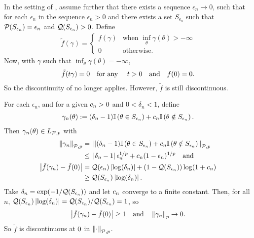 \begin{ex}
%
In the setting of , assume further that there
exists a sequence $\epsilon_n \rightarrow 0$, such that for each $\epsilon_n$ in
the sequence $\epsilon_n > 0$ and there exists a set $S_{\epsilon_n}$ such that
$\mathcal{P}(S_{\epsilon_n}) = \epsilon_n$ and $\mathcal{Q}(S_{\epsilon_n}) > 0$. Define
%
\begin{align*}
%
\tilde{f}(\gamma) = \begin{cases}
    f(\gamma) & \textrm{when }\inf_\theta \gamma(\theta) > -\infty \\
    0 & \textrm{otherwise}.
\end{cases}
%
\end{align*}
%
Now, with $\gamma$ such that $\inf_\theta \gamma(\theta) = -\infty$,
%
\begin{align*}
%
\tilde{f}(\t \gamma) = 0 \mathtxt{for any }\t > 0 \mathtxt{and} f(\phiz) = 0.
%
\end{align*}
%
So the discontinuity of  no longer applies.
However, $\tilde{f}$ is still discontinuous.

For each $\epsilon_n$, and for a given $c_n > 0$ and $0 < \delta_n < 1$, define
%
\begin{align*}
%
\gamma_n(\theta) :=
(\delta_n - 1)\ind{\theta \in S_{\epsilon_n}} +
\c_n \ind{\theta \notin S_{\epsilon_n}}.
%
\end{align*}
%
Then $\gamma_n(\theta) \in {L_{\mathcal{P},p}}$ with
%
\begin{align*}
%
\norm{\gamma_n}_{\p,p} ={}&
\norm{(\delta_n - 1) \ind{\theta \in S_{\epsilon_n}} +
      \c_n \ind{\theta \notin S_{\epsilon_n}}}_{\p,p}
\\\le{}&
    \abs{\delta_n - 1} \epsilon_n^{1/p} +
    \c_n ( 1 - \epsilon_n)^{1/p}
\mathand\\
%
\abs{\tilde{f}(\gamma_n) - \tilde{f}(\phiz)}
={}&
    \q(\epsilon_n) \abs{\log(\delta_n)} +
    (1 - \q(S_{\epsilon_n})) \log(1 + \c_n)
\\\ge{}&
    \q(S_{\epsilon_n}) \abs{\log(\delta_n)}.
%
\end{align*}
Take $\delta_n = \exp(-1 / \mathcal{Q}(S_{\epsilon_n}))$ and let $c_n$ converge to a
finite constant.  Then, for all $n$, $\mathcal{Q}(S_{\epsilon_n}) \left|\log(\delta_n)\right|
= \mathcal{Q}(S_{\epsilon_n}) / \mathcal{Q}(S_{\epsilon_n}) = 1$, so
%
\begin{align*}
%
\abs{\tilde{f}(\gamma_n) - \tilde{f}(\phiz)} \ge{} 1
\mathtxt{and}
\norm{\gamma_n}_p \rightarrow{} 0.
%
\end{align*}
%
So $\tilde{f}$ is discontinuous at $0$ in $\left\Vert\cdot\right\Vert_{\mathcal{P}, p}$.
%
\end{ex}

